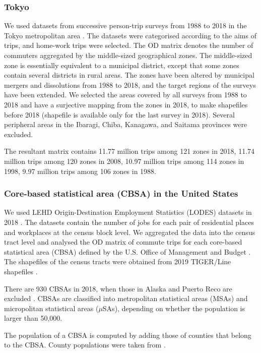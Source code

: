 \documentclass[]{article}
\begin{document}
\subsubsection*{Tokyo} 
We used  datasets from successive person-trip surveys from 1988 to 2018 in the Tokyo metropolitan area \cite{TripDataTokyo}.
The datasets were categorised according to the aims of trips, and home-work trips were selected.
The OD matrix denotes the number of commuters aggregated by the middle-sized geographical zones.
The middle-sized zone is essentially equivalent to a municipal district, except that some zones contain several districts in rural areas.
The zones have been altered by municipal mergers and dissolutions from 1988 to 2018,
and the target regions of the surveys have been extended.
%
We selected the areas covered by all surveys from 1988 to 2018
and have a surjective mapping from the zones in 2018, to make shapefiles before 2018 (shapefile is available only for the last survey in 2018).
Several peripheral areas in the Ibaragi, Chiba, Kanagawa, and  Saitama provinces were excluded.

The resultant matrix contains 
11.77 million trips among 121 zones in 2018, 
11.74 million trips among 120 zones in 2008, 
10.97 million trips among 114 zones in 1998, 
9.97  million trips among 106 zones in 1988.

\subsubsection*{Core-based statistical area (CBSA)  in the United States} 
We used LEHD Origin-Destination Employment Statistics (LODES) datasets in 2018 \cite{TripDataUS}. 
The datasets contain the number of jobs for each pair of residential places and workplaces at the census block level. We aggregated the data into the census tract level and analysed the OD matrix of commute trips for each core-based statistical area (CBSA) defined by the U.S. Office of Management and Budget \cite{CBSADefinition}. The shapefiles of the census tracts were obtained from 2019 TIGER/Line shapefiles \cite{ShapeDataUS}.

There are 930 CBSAs in 2018, when those in Alaska and Puerto Reco are excluded \cite{CBSAList}.
CBSAs are classified into metropolitan statistical areas (MSAs) and micropolitan statistical areas ($\mu$SAs), depending on whether the population is larger than 50,000.

The population of a CBSA is computed by adding  those of counties that belong to the CBSA. County populations were taken from \cite{CBSAPopulation}.
\end{document}
